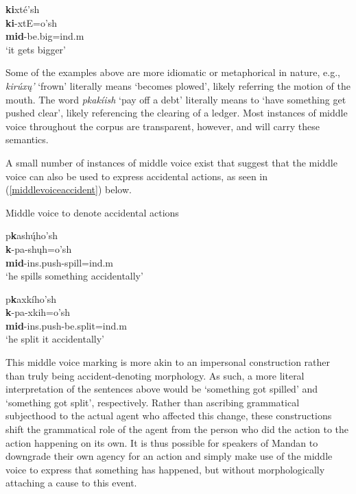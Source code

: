 \begin{exe}
\begin{xlist}
	\item \glll \textbf{ki}xté'sh\\
	\textbf{ki}-xtE=o'sh\\
	\textbf{mid}-\textnormal{be.big}=ind.m\\
	\glt `it gets bigger' \citep[326]{hollow1970}
	
	\end{xlist}

\end{exe}

Some of the examples above are more idiomatic or metaphorical in nature, e.g., \textit{kirúxų'} `frown' literally means `becomes plowed', likely referring the motion of the mouth. The word \textit{pkakíish} `pay off a debt' literally means to `have something get pushed clear', likely referencing the clearing of a ledger. Most instances of middle voice throughout the corpus are transparent, however, and will carry these semantics.

A small number of instances of middle voice exist that suggest that the middle voice can also be used to express accidental actions, as seen in (\ref{middlevoiceaccident}) below.


\begin{exe}
\item\label{middlevoiceaccident} Middle voice to denote accidental actions

	\begin{xlist}

	\item \glll p\textbf{k}ashų́ho'sh\\
	\textbf{k}-pa-shųh=o'sh\\
	\textbf{mid}-ins.push-\textnormal{spill}=ind.m\\
	\glt `he spills something accidentally' \citep[288]{hollow1970}
	
	\item \glll p\textbf{k}axkího'sh\\
	\textbf{k}-pa-xkih=o'sh\\
	\textbf{mid}-ins.push-\textnormal{be.split}=ind.m\\
	\glt `he split it accidentally' \citep[318]{hollow1970}
	
	\end{xlist}
	
\end{exe}

This middle voice marking is more akin to an impersonal construction rather than truly being accident-denoting morphology. As such, a more literal interpretation of the sentences above would be `something got spilled' and `something got split', respectively. Rather than ascribing grammatical subjecthood to the actual agent who affected this change, these constructions shift the grammatical role of the agent from the person who did the action to the action happening on its own. It is thus possible for speakers of Mandan to downgrade their own agency for an action and simply make use of the middle voice to express that something has happened, but without morphologically attaching a cause to this event.

